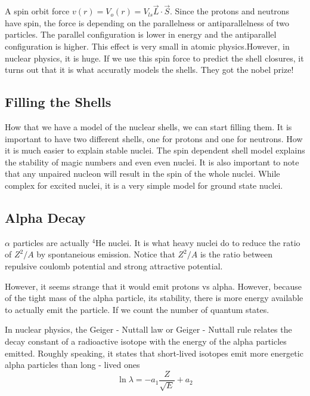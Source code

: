 \documentclass[english, 11pt]{article}
\begin{document}
        A spin orbit force $v(r) = V_o(r) = V_{ls}\vec{L}\cdot\vec{S}$. Since the protons and neutrons have spin, the force is depending on the parallelness or antiparallelness of two particles. The parallel configuration is lower in energy and the antiparallel configuration is higher. This effect is very small in atomic physics.However, in nuclear physics, it is huge. If we use this spin force to predict the shell closures, it turns out that it is what accuratly models the shells. They got the nobel prize!

        \subsection{Filling the Shells}

        How that we have a model of the nuclear shells, we can start filling them. It is important to have two different shells, one for protons and one for neutrons. How it is much easier to explain stable nuclei. The spin dependent shell model explains the stability of magic numbers and even even nuclei. It is also important to note that any unpaired nucleon will result in the spin of the whole nuclei. While complex for excited nuclei, it is a very simple model for ground state nuclei.

        \subsection{Alpha Decay}

        $\alpha$ particles are actually $^4$He nuclei. It is what heavy nuclei do to reduce the ratio of $Z^2/A$ by spontaneious emission. Notice that $Z^2/A$ is the ratio between repulsive coulomb potential and strong attractive potential. 

        However, it seems strange that it would emit protons vs alpha. However, because of the tight mass of the alpha particle, its stability, there is more energy available to actually emit the particle. If we count the number of quantum states. 

        \begin{defn}
           In nuclear physics, the Geiger - Nuttall law or Geiger - Nuttall rule relates the decay constant of a radioactive isotope with the energy of the alpha particles emitted. Roughly speaking, it states that short-lived isotopes emit more energetic alpha particles than long - lived ones
           \[\ln \lambda = -a_1\frac{Z}{\sqrt{E}}+a_2\]
        \end{defn} 
\end{document}
